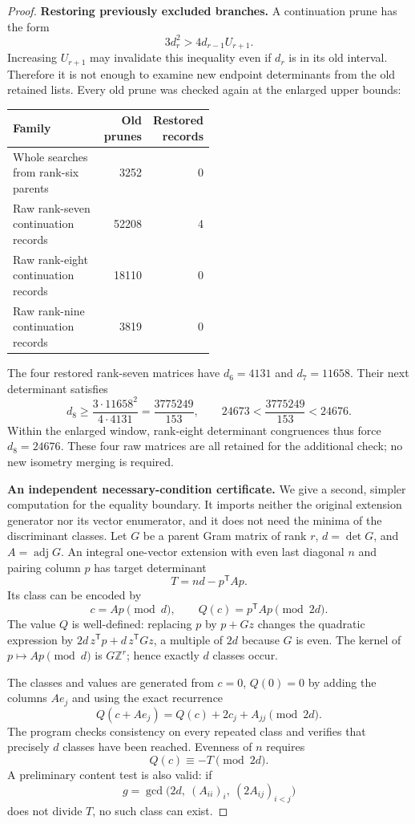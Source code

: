 \documentclass[11pt,a4paper]{article}
\theoremstyle{remark}\newtheorem{remark}[theorem]{Remark}
\newcommand{\Z}{\mathbb Z}\newcommand{\R}{\mathbb R}\newcommand{\F}{\mathbb F}
\begin{document}
\begin{proof}
\textbf{Restoring previously excluded branches.}
A continuation prune has the form
\[
3d_r^2>4d_{r-1}U_{r+1}.
\]
Increasing $U_{r+1}$ may invalidate this inequality even if $d_r$ is in its old interval. Therefore it is not enough to examine new endpoint determinants from the old retained lists. Every old prune was checked again at the enlarged upper bounds:
\begin{center}
\begin{tabular}{P{0.50\linewidth}rr}
\toprule
Family & Old prunes & Restored records\\\midrule
Whole searches from rank-six parents &3252&0\\
Raw rank-seven continuation records &52208&4\\
Raw rank-eight continuation records &18110&0\\
Raw rank-nine continuation records &3819&0\\
\bottomrule
\end{tabular}
\end{center}
The four restored rank-seven matrices have $d_6=4131$ and $d_7=11658$. Their next determinant satisfies
\begin{equation}\label{eq:restored7floor}
d_8\ge\frac{3\cdot11658^2}{4\cdot4131}
=\frac{3775249}{153},\qquad
24673<\frac{3775249}{153}<24676.
\end{equation}
Within the enlarged window, rank-eight determinant congruences thus force $d_8=24676$. These four raw matrices are all retained for the additional check; no new isometry merging is required.

\textbf{An independent necessary-condition certificate.}
We give a second, simpler computation for the equality boundary. It imports neither the original extension generator nor its vector enumerator, and it does not need the minima of the discriminant classes. Let $G$ be a parent Gram matrix of rank $r$, $d=\det G$, and $A=\operatorname{adj}G$. An integral one-vector extension with even last diagonal $n$ and pairing column $p$ has target determinant
\[
T=nd-p^{\mathsf T}Ap.
\]
Its class can be encoded by
\[
c=Ap\pmod d,\qquad Q(c)=p^{\mathsf T}Ap\pmod{2d}.
\]
The value $Q$ is well-defined: replacing $p$ by $p+Gz$ changes the quadratic expression by $2d\,z^{\mathsf T}p+d\,z^{\mathsf T}Gz$, a multiple of $2d$ because $G$ is even. The kernel of $p\mapsto Ap\pmod d$ is $G\Z^r$; hence exactly $d$ classes occur.

The classes and values are generated from $c=0$, $Q(0)=0$ by adding the columns $Ae_j$ and using the exact recurrence
\begin{equation}\label{eq:finitequadraticrecurrence}
Q(c+Ae_j)=Q(c)+2c_j+A_{jj}\pmod{2d}.
\end{equation}
The program checks consistency on every repeated class and verifies that precisely $d$ classes have been reached. Evenness of $n$ requires
\begin{equation}\label{eq:boundaryquadraticcondition}
Q(c)\equiv-T\pmod{2d}.
\end{equation}
A preliminary content test is also valid: if
\[
g=\gcd\bigl(2d,\ (A_{ii})_i,\ (2A_{ij})_{i<j}\bigr)
\]
does not divide $T$, no such class can exist.


\end{proof}
\end{document}
